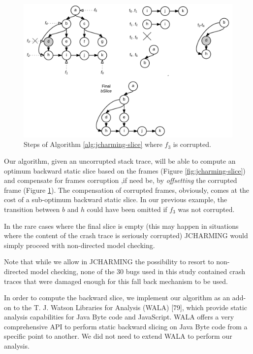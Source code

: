 \documentclass[12pt]{report}
\begin{document}
\begin{figure}
  \centering
    \includegraphics[scale=.20]{media/chap8/algo.png}
    \caption{Steps of Algorithm \ref{alg:jcharming-slice} where $f_3$ is corrupted.
    \label{fig:jcharming-algo}}
\end{figure}

Our algorithm, given an uncorrupted stack trace, will be able to compute
an optimum backward static slice based on the frames (Figure
\ref{fig:jcharming-slice}) and compensate for frames corruption ,if need
be, by \textit{offsetting} the corrupted frame (Figure
\ref{fig:jcharming-algo}). The compensation of corrupted frames,
obviously, comes at the cost of a sub-optimum backward static slice. In
our previous example, the transition between \(b\) and \(h\) could have
been omitted if \(f_3\) was not corrupted.

In the rare cases where the final slice is empty (this may happen in
situations where the content of the crash trace is seriously corrupted)
JCHARMING would simply proceed with non-directed model checking.

Note that while we allow in JCHARMING the possibility to resort to
non-directed model checking, none of the 30 bugs used in this study
contained crash traces that were damaged enough for this fall back
mechanism to be used.

In order to compute the backward slice, we implement our algorithm as an
add-on to the T. J. Watson Libraries for Analysis (WALA) {[}79{]}, which
provide static analysis capabilities for Java Byte code and JavaScript.
WALA offers a very comprehensive API to perform static backward slicing
on Java Byte code from a specific point to another. We did not need to
extend WALA to perform our analysis.
\end{document}
